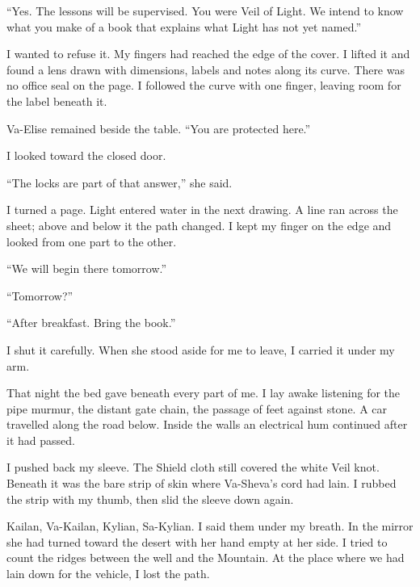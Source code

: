 ``Yes. The lessons will be supervised. You were Veil of Light. We intend to know what you make of a book that explains what Light has not yet named.''\par

I wanted to refuse it. My fingers had reached the edge of the cover. I lifted it and found a lens drawn with dimensions, labels and notes along its curve. There was no office seal on the page. I followed the curve with one finger, leaving room for the label beneath it.\par

Va-Elise remained beside the table. ``You are protected here.''\par

I looked toward the closed door.\par

``The locks are part of that answer,'' she said.\par

I turned a page. Light entered water in the next drawing. A line ran across the sheet; above and below it the path changed. I kept my finger on the edge and looked from one part to the other.\par

``We will begin there tomorrow.''\par

``Tomorrow?''\par

``After breakfast. Bring the book.''\par

I shut it carefully. When she stood aside for me to leave, I carried it under my arm.\par

\ornament

That night the bed gave beneath every part of me. I lay awake listening for the pipe murmur, the distant gate chain, the passage of feet against stone. A car travelled along the road below. Inside the walls an electrical hum continued after it had passed.\par

I pushed back my sleeve. The Shield cloth still covered the white Veil knot. Beneath it was the bare strip of skin where Va-Sheva's cord had lain. I rubbed the strip with my thumb, then slid the sleeve down again.\par

Kailan, Va-Kailan, Kylian, Sa-Kylian. I said them under my breath. In the mirror she had turned toward the desert with her hand empty at her side. I tried to count the ridges between the well and the Mountain. At the place where we had lain down for the vehicle, I lost the path.\par

